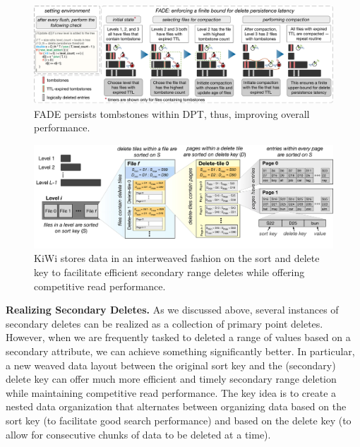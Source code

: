 \documentclass[11pt,dvipdfmx]{article}
\newcommand\Paragraph[1]{\vspace{0.02in}  \noindent \textbf{#1.}}
\begin{document}
\begin{figure}[t]
    \centering  
        \includegraphics[width=\textwidth]{figs/effacingcompaction.pdf} 
        \vspace{-0.25in}        
    \caption{FADE persists tombstones within DPT, thus, improving overall performance.}
    \label{fig:ec} 
\vspace{0.2in}        
\end{figure} 

\begin{figure}[t]
    \centering  
        \includegraphics[width=\textwidth]{figs/storage_layout.pdf} 
   \vspace{-0.25in}        
    \caption{KiWi stores data in an interweaved fashion on the sort and delete key to facilitate efficient secondary range deletes while offering competitive  read performance.}
    \label{fig:layout} 
   \vspace{-0.15in}        
\end{figure} 


\Paragraph{Realizing Secondary Deletes}
As we discussed above, several instances of secondary deletes can be realized as
a collection of primary point deletes. However, when we are frequently tasked to
deleted a range of values based on a secondary attribute, we can achieve something
significantly better. In particular, a new weaved data layout between the original
sort key and the (secondary) delete key can offer much more efficient and timely
secondary range deletion while maintaining competitive read performance. The key idea is
to create a nested data organization that alternates between organizing data
based on the sort key (to facilitate good search performance) and based on the
delete key (to allow for consecutive chunks of data to be deleted at a time). 
\end{document}
